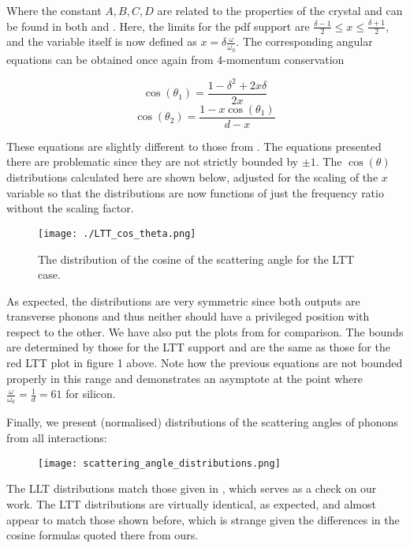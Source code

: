\documentclass[11pt]{article}
\begin{document}
Where the constant $A, B, C, D$ are related to the properties of the crystal and can be found in both \cite{2} and \cite{3}. Here, the limits
for the pdf support are $\frac{\delta - 1}{2} \leq x \leq \frac{\delta + 1}{2}$, and the variable itself is now defined as $x = \delta\frac{\omega}
{\omega_0}$. The corresponding angular equations can be obtained once again from
4-momentum conservation 

\begin{equation}
\cos(\theta_1) = \frac{1 - \delta^2 + 2x\delta}{2x}
\end{equation}
\begin{equation}
\cos(\theta_2) = \frac{1 - x\cos(\theta_1)}{d - x}
\end{equation}

These equations are slightly different to those from \cite{1}. The equations presented there are problematic since they are not strictly bounded
by $\pm 1$. The $\cos(\theta)$ distributions calculated here are shown below, adjusted for the scaling of the $x$ variable so that the distributions
are now functions of just the frequency ratio without the scaling factor.

\begin{figure}[!h]
\centering
\texttt{[image: ./LTT\_cos\_theta.png]}
\caption{The distribution of the cosine of the scattering angle for the LTT case.}
\end{figure}

As expected, the distributions are very symmetric since both outputs are transverse phonons and thus neither should have a privileged position with 
respect to the other. We have also put the plots from \cite{2} for comparison. The bounds are determined by those for the LTT support and are
the same as those for the red LTT plot in figure 1 above. Note how the previous equations are not bounded properly in this range and 
demonstrates an asymptote at the point where $\frac{\omega}{\omega_0} = \frac{1}{d} = 61$ for silicon.

\pagebreak
Finally, we present (normalised) distributions of the scattering angles of phonons from all interactions:

\begin{figure}[!h]
\centering
\texttt{[image: scattering\_angle\_distributions.png]}
\end{figure}

The LLT distributions match those given in \cite{1}, which serves as a check on our work. The LTT distributions are virtually identical, as expected,
and almost appear to match those shown before, which is strange given the differences in the cosine formulas quoted there from ours. 
\end{document}
